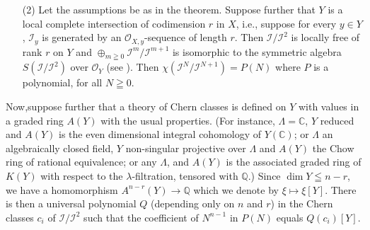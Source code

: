 \begin{remarks*}
\begin{itemize}
\item[(2)] Let the assumptions be as in the theorem. Suppose further that $Y$ is a local complete intersection of codimension $r$ in $X$, i.e., suppose for every $y \in Y$, $\mathscr{I}_y$ is generated by an $\mathscr{O}_{X,y}$-sequence of length $r$. Then $\mathscr{I}/ \mathscr{I}^2$ is locally free of rank $r$ on $Y$ and $\oplus_{m \geqq 0} \mathscr{I}^m / \mathscr{I}^{m+1}$ is isomorphic to the symmetric algebra $S (\mathscr{I}/ \mathscr{I}^2)$ over $\mathscr{O}_Y$ (see \cite{art11-key5}). Then $\chi (\mathscr{I}^N / \mathscr{I}^{N+1}) = P(N)$ where $P$ is a polynomial, for all $N \geqq 0$.
\end{itemize}
\end{remarks*}

Now,\pageoriginale suppose further that a theory of Chern classes is defined on $Y$ with values in a graded ring $A(Y)$ with the usual properties. (For instance, $\Lambda = \mathbb{C}$, $Y$ reduced and $A(Y)$ is the even dimensional integral cohomology of $Y (\mathbb{C})$; or $\Lambda$ an algebraically closed field, $Y$ non-singular projective over $\Lambda$ and $A (Y)$ the Chow ring of rational equivalence; or any $\Lambda$, and $A(Y)$ is the associated graded ring of $K(Y)$ with respect to the $\lambda$-filtration, tensored with $\mathbb{Q}$.) Since $\dim Y \leqq n - r$, we have a homomorphism $A^{n-r} (Y) \to \mathbb{Q}$ which we denote by $\xi \mapsto \xi [Y]$. There is then a universal polynomial $Q$ (depending only on $n$ and $r$) in the Chern classes $c_i$ of $\mathscr{I}/ \mathscr{I}^2$ such that the coefficient of $N^{n-1} $ in $P(N)$ equals $Q(c_i) [Y]$.

